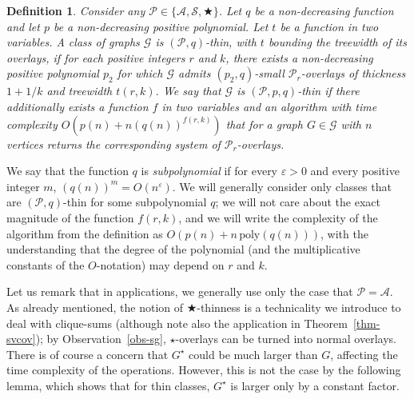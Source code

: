 \documentclass[a4paper,11pt]{article}
\newcommand{\Aa}{{\mathcal A}}
\newcommand{\GG}{{\mathcal G}}
\newcommand{\Ss}{{\mathcal S}}
\newcommand{\PP}{{\mathcal P}}
\newcommand{\poly}{\text{poly}}
\newtheorem{definition}{Definition}
\begin{document}
\begin{definition}\label{def-admit}
Consider any $\PP\in\{\Aa,\Ss,\bigstar\}$.  Let $q$ be a non-decreasing function and let $p$ be a non-decreasing positive polynomial.
Let $t$ be a function in two variables.
A class of graphs $\GG$ is \emph{$(\PP,q)$-thin}, with $t$ \emph{bounding the treewidth of its overlays}, if
for each positive integers $r$ and $k$, there exists a non-decreasing positive polynomial $p_2$
for which $\GG$ admits $(p_2,q)$-small $\PP_r$-overlays of thickness $1+1/k$ and treewidth $t(r,k)$.
We say that $\GG$ is \emph{$(\PP,p,q)$-thin} if there additionally exists a function $f$ in two variables
and an algorithm with time complexity $O(p(n)+n(q(n))^{f(r,k)})$ that for a graph $G\in \GG$ with $n$ vertices
returns the corresponding system of $\PP_r$-overlays.
\end{definition}

We say that the function $q$ is \emph{subpolynomial} if for every $\varepsilon>0$ and every positive integer $m$, $(q(n))^m=O(n^\varepsilon)$.
We will generally consider only classes that are $(\PP,q)$-thin for some subpolynomial $q$; we will not care about the exact
magnitude of the function $f(r,k)$, and we will write the complexity of the algorithm from the definition as
$O(p(n)+n\,\poly(q(n)))$, with the understanding that the degree of the polynomial
(and the multiplicative constants of the $O$-notation) may depend on $r$ and $k$.

Let us remark that in applications, we generally use only the case that $\PP=\Aa$.
As already mentioned, the notion of $\bigstar$-thinness is a technicality we introduce
to deal with clique-sums (although note also the application in Theorem~\ref{thm-svcov});
by Observation~\ref{obs-sg}, $\star$-overlays can be turned into normal overlays.
There is of course a concern that $G^\star$ could be much larger than $G$, affecting the time complexity of the operations.
However, this is not the case by the following lemma, which shows that for thin classes, $G^\star$ is larger only by a constant factor.
\end{document}

